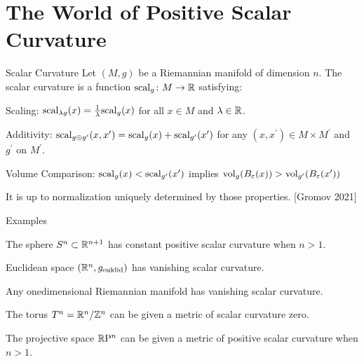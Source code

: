 \documentclass{presis}
\begin{document}
\maketitle

\section{The World of Positive Scalar Curvature}

\begin{frame}{Scalar Curvature}
    Let $(M,g)$ be a Riemannian manifold of dimension $n$.\pause{}
    The scalar curvature is a function $\mathrm{scal}_g\colon M\to \mathbb{R}$ satisfying:\pause
    \begin{vfilleditems}
        \item Scaling: $\mathrm{scal}_{\lambda g}(x) = \frac{1}{\lambda} \mathrm{scal}_g(x)$ for all $x\in M$ and $\lambda\in\mathbb{R}$.\pause
        \item Additivity: $\mathrm{scal}_{g\oplus g^\prime}(x,x^\prime) = \mathrm{scal}_g(x) + \mathrm{scal}_{g^\prime}(x^\prime)$ for any $(x,x^\prime)\in M\times M^\prime$ and $g^\prime$ on $M^\prime$.\\\pause
        \item Volume Comparison: $\mathrm{scal}_g(x) < \mathrm{scal}_{g^\prime}(x^\prime)$ implies $\mathrm{vol}_g(B_\varepsilon(x)) > \mathrm{vol}_{g^\prime}(B_\varepsilon(x^\prime))$
    \end{vfilleditems}\pause
    It is up to normalization uniquely determined by those properties. [Gromov 2021] 
\end{frame}

\begin{frame}{Examples}
    \begin{vfilleditems}
    \item The sphere $S^n\subset\mathbb{R}^{n+1}$ has constant positive scalar curvature when $n>1$.\pause
    \item Euclidean space $(\mathbb{R}^n,g_{\text{euklid}})$ has vanishing scalar curvature.\pause
    \item Any onedimensional Riemannian manifold has vanishing scalar curvature.\pause
    \item The torus $T^n = \mathbb{R}^n/\mathbb{Z}^n$ can be given a metric of scalar curvature zero.\pause
    \item The projective space $\mathbb{R}\mathrm{P}^n$ can be given a metric of positive scalar curvature when $n>1$.
    \end{vfilleditems}
\end{frame}
\end{document}
